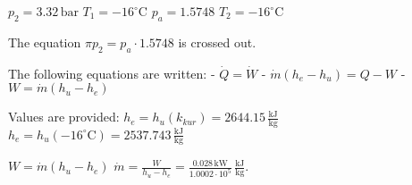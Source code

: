 \( p_2 = 3.32 \, \text{bar} \)  
\( T_1 = -16^\circ \text{C} \)  
\( p_a = 1.5748 \)  
\( T_2 = -16^\circ \text{C} \)  

The equation \( \pi p_2 = p_a \cdot 1.5748 \) is crossed out.  

The following equations are written:  
- \( \dot{Q} = \dot{W} \)  
- \( \dot{m} (h_e - h_u) = Q - W \)  
- \( W = \dot{m} (h_u - h_e) \)  

Values are provided:  
\( h_e = h_u (k_{kur}) = 2644.15 \, \frac{\text{kJ}}{\text{kg}} \)  
\( h_e = h_u (-16^\circ \text{C}) = 2537.743 \, \frac{\text{kJ}}{\text{kg}} \)  

\( W = \dot{m} (h_u - h_e) \)  
\( \dot{m} = \frac{W}{h_u - h_e} = \frac{0.028 \, \text{kW}}{1.0002 \cdot 10^5} \, \frac{\text{kJ}}{\text{kg}} \).